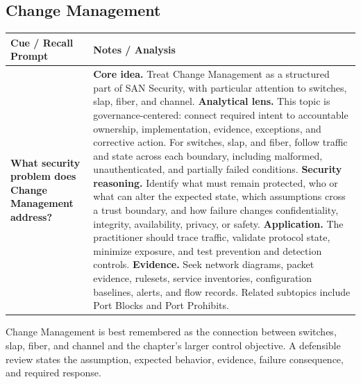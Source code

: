 \documentclass[11pt]{article}
\newcommand{\CornellHeader}{%
\rowcolor{Navy}\color{white}\bfseries Cue / Recall Prompt & \color{white}\bfseries Notes / Analysis\\\hline}
\newcommand{\CornellRow}[2]{%
\cellcolor{CueGray}\RaggedRight\textbf{#1} & \RaggedRight #2\\\hline}
\begin{document}
\subsection*{Change Management}
\begin{longtable}{>{\RaggedRight\arraybackslash}p{}|>{\RaggedRight\arraybackslash}p{}}
\CornellHeader
\CornellRow{What security problem does Change Management address?}{\textbf{Core idea.} Treat Change Management as a structured part of SAN Security, with particular attention to switches, slap, fiber, and channel. \textbf{Analytical lens.} This topic is governance-centered: connect required intent to accountable ownership, implementation, evidence, exceptions, and corrective action. For switches, slap, and fiber, follow traffic and state across each boundary, including malformed, unauthenticated, and partially failed conditions. \textbf{Security reasoning.} Identify what must remain protected, who or what can alter the expected state, which assumptions cross a trust boundary, and how failure changes confidentiality, integrity, availability, privacy, or safety. \textbf{Application.} The practitioner should trace traffic, validate protocol state, minimize exposure, and test prevention and detection controls. \textbf{Evidence.} Seek network diagrams, packet evidence, rulesets, service inventories, configuration baselines, alerts, and flow records. Related subtopics include Port Blocks and Port Prohibits.}
\end{longtable}
\begin{topicsummary}
Change Management is best remembered as the connection between switches, slap, fiber, and channel and the chapter's larger control objective. A defensible review states the assumption, expected behavior, evidence, failure consequence, and required response.
\end{topicsummary}
\end{document}
